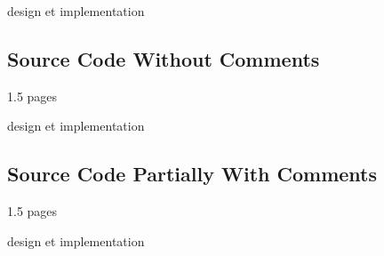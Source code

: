 
design et implementation

\subsection{Source Code Without Comments}

1.5 pages


design et implementation

\subsection{Source Code Partially With Comments}

1.5 pages


design et implementation


